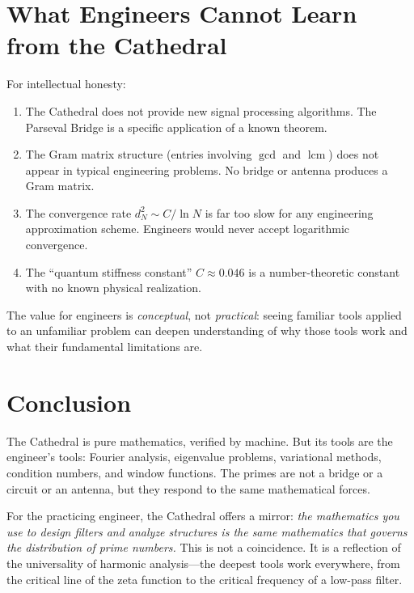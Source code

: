 \documentclass[11pt,a4paper]{article}
\begin{document}
\section{What Engineers Cannot Learn from the Cathedral}
\label{sec:cannot}

For intellectual honesty:

\begin{enumerate}
  \item The Cathedral does not provide new signal processing
    algorithms. The Parseval Bridge is a specific application of a
    known theorem.
  \item The Gram matrix structure (entries involving $\gcd$ and
    $\operatorname{lcm}$) does not appear in typical engineering
    problems. No bridge or antenna produces a Gram matrix.
  \item The convergence rate $d_N^2 \sim C / \ln N$ is far too slow
    for any engineering approximation scheme. Engineers would never
    accept logarithmic convergence.
  \item The ``quantum stiffness constant'' $C \approx 0.046$ is a
    number-theoretic constant with no known physical realization.
\end{enumerate}

The value for engineers is \emph{conceptual}, not \emph{practical}:
seeing familiar tools applied to an unfamiliar problem can deepen
understanding of why those tools work and what their fundamental
limitations are.

\section{Conclusion}

The Cathedral is pure mathematics, verified by machine. But its
tools are the engineer's tools: Fourier analysis, eigenvalue
problems, variational methods, condition numbers, and window
functions. The primes are not a bridge or a circuit or an antenna,
but they respond to the same mathematical forces.

For the practicing engineer, the Cathedral offers a mirror:
\emph{the mathematics you use to design filters and analyze
structures is the same mathematics that governs the distribution of
prime numbers.} This is not a coincidence. It is a reflection of the
universality of harmonic analysis---the deepest tools work
everywhere, from the critical line of the zeta function to the
critical frequency of a low-pass filter.
\end{document}
